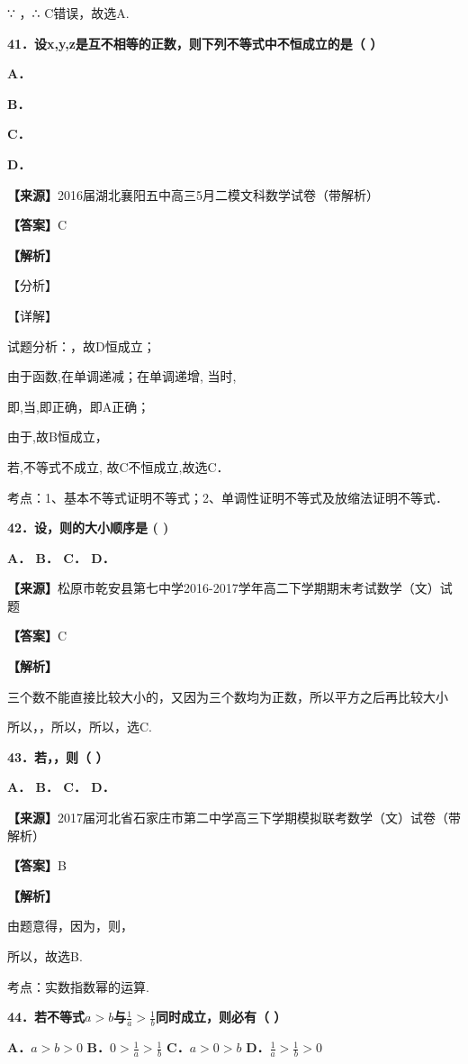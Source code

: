\documentclass[
]{article}
\begin{document}
∵ ，∴ C错误，故选A.

\textbf{41．设x,y,z是互不相等的正数，则下列不等式中不恒成立的是（ ）}

\textbf{A．}

\textbf{B．}

\textbf{C．}

\textbf{D．}

\textbf{【来源】}2016届湖北襄阳五中高三5月二模文科数学试卷（带解析）

\textbf{【答案】}C

\textbf{【解析】}

【分析】

【详解】

试题分析：，故D恒成立；

由于函数,在单调递减；在单调递增, 当时,

即,当,即正确，即A正确；

由于,故B恒成立，

若,不等式不成立, 故C不恒成立,故选C．

考点：1、基本不等式证明不等式；2、单调性证明不等式及放缩法证明不等式．

\textbf{42．设，则的大小顺序是 ( )}

\textbf{A． B． C． D．}

\textbf{【来源】}松原市乾安县第七中学2016-2017学年高二下学期期末考试数学（文）试题

\textbf{【答案】}C

\textbf{【解析】}

三个数不能直接比较大小的，又因为三个数均为正数，所以平方之后再比较大小

所以，，所以，所以，选C.

\textbf{43．若，，则（ ）}

\textbf{A． B． C． D．}

\textbf{【来源】}2017届河北省石家庄市第二中学高三下学期模拟联考数学（文）试卷（带解析）

\textbf{【答案】}B

\textbf{【解析】}

由题意得，因为，则，

所以，故选B.

考点：实数指数幂的运算.

\textbf{44．若不等式}\(a > b\)\textbf{与}\(\frac{1}{a} > \frac{1}{b}\)\textbf{同时成立，则必有（
）}

\textbf{A．}\(a > b > 0\) \textbf{B．}\(0 > \frac{1}{a} > \frac{1}{b}\)
\textbf{C．}\(a > 0 > b\) \textbf{D．}\(\frac{1}{a} > \frac{1}{b} > 0\)
\end{document}
